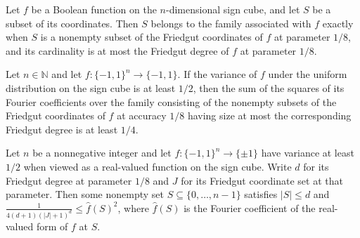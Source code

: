 \begin{theorem}
\label{FABL.mem_corollary9_32Family}
\leanok
{}
Let $f$ be a Boolean function on the $n$-dimensional sign cube, and let $S$ be a subset
of its coordinates. Then $S$ belongs to the family associated with $f$ exactly when $S$
is a nonempty subset of the Friedgut coordinates of $f$ at parameter $1/8$, and its
cardinality is at most the Friedgut degree of $f$ at parameter $1/8$.
\end{theorem}

\begin{theorem}
\label{FABL.one_fourth_le_sum_corollary9_32Family}
\leanok
{}
Let $n\in\mathbb{N}$ and let $f:\{-1,1\}^n\to\{-1,1\}$. If the variance of $f$ under the
uniform distribution on the sign cube is at least $1/2$, then the sum of the squares of
its Fourier coefficients over the family consisting of the nonempty subsets of the
Friedgut coordinates of $f$ at accuracy $1/8$ having size at most the corresponding
Friedgut degree is at least $1/4$.
\end{theorem}

\begin{theorem}
\label{FABL.exists_large_lowDegree_fourierCoeff}
\leanok
{}
Let $n$ be a nonnegative integer and let $f:\{-1,1\}^n\to\{\pm1\}$ have variance at
least $1/2$ when viewed as a real-valued function on the sign cube. Write $d$ for its
Friedgut degree at parameter $1/8$ and $J$ for its Friedgut coordinate set at that
parameter. Then some nonempty set $S\subseteq\{0,\ldots,n-1\}$ satisfies $|S|\le d$ and
$\frac{1}{4(d+1)(|J|+1)^d}\le \widehat f(S)^2$, where $\widehat f(S)$ is the Fourier
coefficient of the real-valued form of $f$ at $S$.
\end{theorem}

